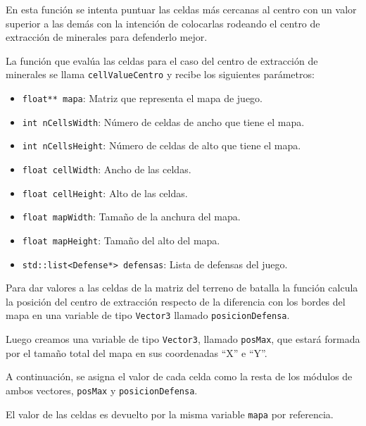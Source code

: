 En esta función se intenta puntuar las celdas más cercanas al centro con un valor superior a las demás con la intención de colocarlas rodeando el centro de extracción de minerales para defenderlo mejor.

La función que evalúa las celdas para el caso del centro de extracción de minerales se llama \texttt{cellValueCentro} y recibe los siguientes parámetros:
\begin{itemize}
	\item \texttt{float** mapa}: Matriz que representa el mapa de juego.
	\item \texttt{int nCellsWidth}: Número de celdas de ancho que tiene el mapa.
	\item \texttt{int nCellsHeight}: Número de celdas de alto que tiene el mapa.
	\item \texttt{float cellWidth}: Ancho de las celdas.
	\item \texttt{float cellHeight}: Alto de las celdas.
	\item \texttt{float mapWidth}: Tamaño de la anchura del mapa.
	\item \texttt{float mapHeight}: Tamaño del alto del mapa.
	\item \texttt{std::list<Defense*> defensas}: Lista de defensas del juego.
\end{itemize}
Para dar valores a las celdas de la matriz del terreno de batalla la función calcula la posición del centro de extracción respecto de la diferencia con los bordes del mapa en una variable de tipo \texttt{Vector3} llamado \texttt{posicionDefensa}.

Luego creamos una variable de tipo \texttt{Vector3}, llamado \texttt{posMax}, que estará formada por el tamaño total del mapa en sus coordenadas ``X'' e ``Y''.

A continuación, se asigna el valor de cada celda como la resta de los módulos de ambos vectores, \texttt{posMax} y \texttt{posicionDefensa}.

El valor de las celdas es devuelto por la misma variable \texttt{mapa} por referencia.
\newpage